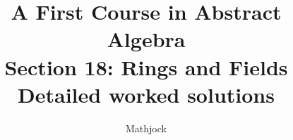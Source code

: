 
\title{\textbf{A First Course in Abstract Algebra}\\[0.3em]Section 18: Rings and Fields\\[0.3em]\large Detailed worked solutions}
\author{Mathjock}
\date{}

\maketitle
\bookinfo
\tableofcontents
\clearpage
\renewcommand{\thesection}{18}
\renewcommand{\theHsection}{fraleigh.18}


